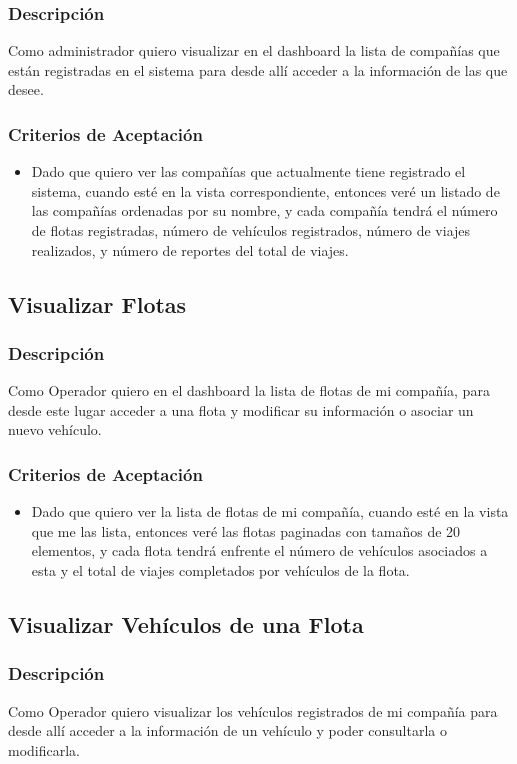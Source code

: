 \documentclass{article}
\begin{document}
\subsubsection{Descripción}
Como administrador quiero visualizar en el dashboard la lista de compañías que están registradas en el sistema para desde allí acceder a la información de las que desee.
\subsubsection{Criterios de Aceptación}
\begin{itemize}
    \item Dado que quiero ver las compañías que actualmente tiene registrado el sistema, cuando esté en la vista correspondiente, entonces veré un listado de las compañías ordenadas por su nombre, y cada compañía tendrá el número de flotas registradas, número de vehículos registrados, número de viajes realizados, y número de reportes del total de viajes.
\end{itemize}

\subsection{Visualizar Flotas}
\subsubsection{Descripción}
Como Operador quiero en el dashboard la lista de flotas de mi compañía, para desde este lugar acceder a una flota y modificar su información o asociar un nuevo vehículo.
\subsubsection{Criterios de Aceptación}
\begin{itemize}
    \item Dado que quiero ver la lista de flotas de mi compañía, cuando esté en la vista que me las lista, entonces veré las flotas paginadas con tamaños de 20 elementos, y cada flota tendrá enfrente el número de vehículos asociados a esta y el total de viajes completados por vehículos de la flota. 
\end{itemize}

\subsection{Visualizar Vehículos de una Flota}
\subsubsection{Descripción}
Como Operador quiero visualizar los vehículos registrados de mi compañía para desde allí acceder a la información de un vehículo y poder consultarla o modificarla.
\end{document}
